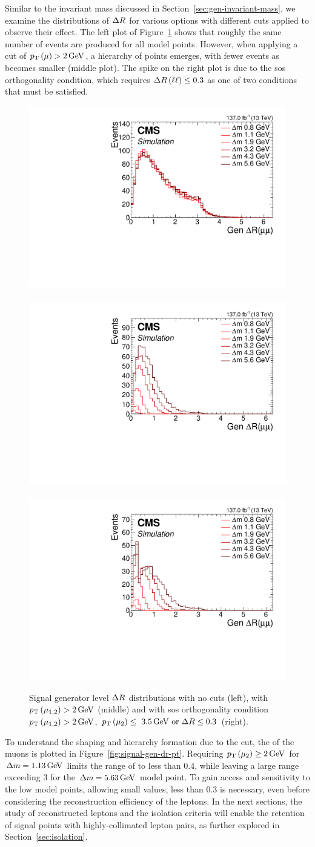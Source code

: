 Similar to the invariant mass discussed in Section~\ref{sec:gen-invariant-mass}, we examine the distributions of $\Delta R$ for various \dm options with different cuts applied to observe their effect. The left plot of Figure~\ref{fig:signal-generator-dr} shows that roughly the same number of events are produced for all \dm model points. However, when applying a cut of $p_{\mathrm{T}}\left(\mu\right)>2\,\text{Ge\hspace{-.08em}V}$, a hierarchy of \dm points emerges, with fewer events as \dm becomes smaller (middle plot). The spike on the right plot is due to the \gls{sos} orthogonality condition, which requires $\Delta R\left(\ell\ell\right)\leq 0.3$ as one of two conditions that must be satisfied.

\begin{figure}[!htb]
\centering
\includegraphics[width=0.32\linewidth]{plots/signal_muons_gen/none_gen_deltaR.pdf} \,
\includegraphics[width=0.32\linewidth]{plots/signal_muons_gen/none_gen_deltaR_cut.pdf}  \,
\includegraphics[width=0.32\linewidth]{plots/signal_muons_gen/none_gen_deltaR_orth.pdf} \\
\caption[Signal generator level \DR distributions]{ Signal generator level $\Delta R$ distributions with no cuts (left), with $p_{\mathrm{T}}\left(\mu_{1,2}\right)>2\,\text{Ge\hspace{-.08em}V}$ (middle) and with \gls{sos} orthogonality condition $p_{\mathrm{T}}\left(\mu_{1,2}\right)>2\,\text{Ge\hspace{-.08em}V}$, $p_{\mathrm{T}}\left(\mu_2\right)\leq~3.5\,\text{Ge\hspace{-.08em}V}\text{ or }\Delta R\leq 0.3$ (right).}
\label{fig:signal-generator-dr}
\end{figure}

To understand the shaping and hierarchy formation due to the \pt cut, the \pt of the muons is plotted \vs \drll in Figure~\ref{fig:signal-gen-dr-pt}. Requiring $p_{\mathrm{T}}\left(\mu_2\right)\geq 2\,\text{Ge\hspace{-.08em}V}$ for $\Delta m=1.13\,\text{Ge\hspace{-.08em}V}$ limits the range of \drmm to less than $0.4$, while leaving a large range exceeding 3 for the $\Delta m=5.63\,\text{Ge\hspace{-.08em}V}$ model point. To gain access and sensitivity to the low \dm model points, allowing small \drll values, less than 0.3 is necessary, even before considering the reconstruction efficiency of the leptons. In the next sections, the study of reconstructed leptons and the isolation criteria will enable the retention of signal points with highly-collimated lepton pairs, as further explored in Section~\ref{sec:isolation}.

